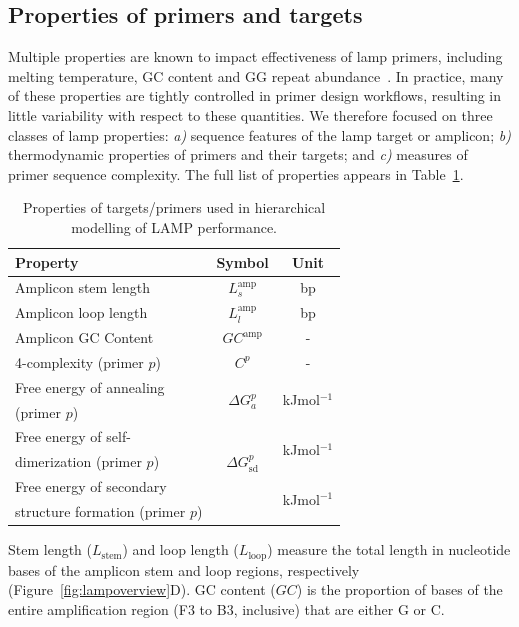 \documentclass[../thesis.tex]{subfiles}
\begin{document}
\subsection{Properties of primers and targets \label{sec:freeenergy}}
Multiple properties are known to impact effectiveness of \gls{lamp} primers, including melting temperature, GC content and GG repeat abundance~\citep{eiken_primerexplorer_2019}. In practice, many of these properties are tightly controlled in primer design workflows, resulting in little variability with respect to these quantities. We therefore focused on three classes of \gls{lamp} properties: \emph{a)} sequence features of the \gls{lamp} target or amplicon; \emph{b)} thermodynamic properties of primers and their targets; and \emph{c)} measures of primer sequence complexity. The full list of properties appears in Table~\ref{tab:properties}. 
\begin{table}[!t] 
\centering
{\begin{tabular}{|l|cc|}
\hline Property & Symbol &
Unit  \\\hline
Amplicon stem length & $L_s^{\text{amp}}$ & bp  \\
Amplicon loop length & $L_l^{\text{amp}}$ & bp  \\
Amplicon GC Content & $GC^{\text{amp}}$ & -  \\
4-complexity (primer $p$) & $C^p$ & -  \\ 
Free energy of annealing & \multirow{2}{*}{$\Delta G_a^p$} & \multirow{2}{*}{kJmol$^{-1}$}  \\
(primer $p$) &  & \\
Free energy of self- & \multirow{3}{*}{$\Delta G^p_{\text{sd}}$} & \multirow{2}{*}{kJmol$^{-1}$} \\
dimerization (primer $p$)  & &  \\
Free energy of secondary  & \multirow{2}{*}{$\Delta G^p_{\text{ss}}$} & \multirow{2}{*}{kJmol$^{-1}$} \\
structure formation (primer $p$) & &  \\ 
\hline
\end{tabular}}
\caption{Properties of targets/primers used in hierarchical modelling of LAMP performance.\label{tab:properties}} 
\end{table}
Stem length ($L_{\text{stem}}$) and loop length ($L_{\text{loop}}$) measure the total length in nucleotide bases of the amplicon stem and loop regions, respectively (Figure~\ref{fig:lampoverview}D). GC content ($GC$) is the proportion of bases of the entire amplification region (F3 to B3, inclusive) that are either G or C.
\end{document}
